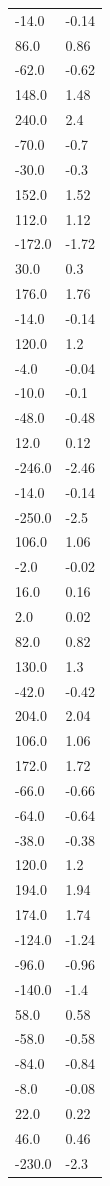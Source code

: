 \begin{longtable}{ll}
-14.0 & -0.14 \\
86.0 & 0.86 \\
-62.0 & -0.62 \\
148.0 & 1.48 \\
240.0 & 2.4 \\
-70.0 & -0.7 \\
-30.0 & -0.3 \\
152.0 & 1.52 \\
112.0 & 1.12 \\
-172.0 & -1.72 \\
30.0 & 0.3 \\
176.0 & 1.76 \\
-14.0 & -0.14 \\
120.0 & 1.2 \\
-4.0 & -0.04 \\
-10.0 & -0.1 \\
-48.0 & -0.48 \\
12.0 & 0.12 \\
-246.0 & -2.46 \\
-14.0 & -0.14 \\
-250.0 & -2.5 \\
106.0 & 1.06 \\
-2.0 & -0.02 \\
16.0 & 0.16 \\
2.0 & 0.02 \\
82.0 & 0.82 \\
130.0 & 1.3 \\
-42.0 & -0.42 \\
204.0 & 2.04 \\
106.0 & 1.06 \\
172.0 & 1.72 \\
-66.0 & -0.66 \\
-64.0 & -0.64 \\
-38.0 & -0.38 \\
120.0 & 1.2 \\
194.0 & 1.94 \\
174.0 & 1.74 \\
-124.0 & -1.24 \\
-96.0 & -0.96 \\
-140.0 & -1.4 \\
58.0 & 0.58 \\
-58.0 & -0.58 \\
-84.0 & -0.84 \\
-8.0 & -0.08 \\
22.0 & 0.22 \\
46.0 & 0.46 \\
-230.0 & -2.3 \\

\end{longtable}
